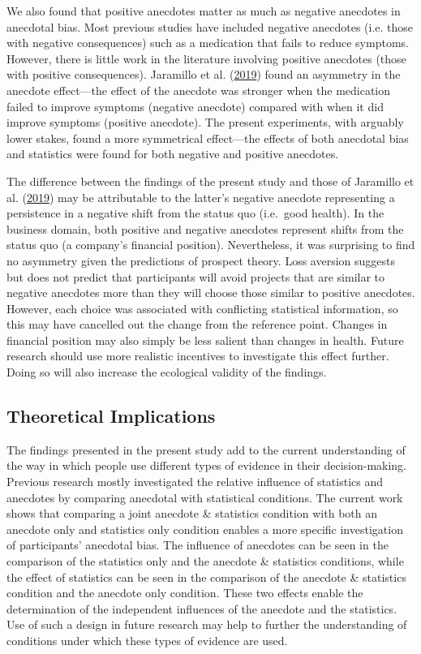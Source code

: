 \documentclass[
  man, donotrepeattitle,floatsintext]{apa7}
\theoremstyle{definition}
\theoremstyle{definition}
\theoremstyle{definition}
\theoremstyle{definition}
\theoremstyle{remark}
\begin{document}
We also found that positive anecdotes matter as much as negative anecdotes in
anecdotal bias. Most previous studies have included negative anecdotes (i.e.
those with negative consequences) such as a medication that fails to reduce
symptoms. However, there is little work in the literature involving positive
anecdotes (those with positive consequences). Jaramillo et al. (\protect\hyperlink{ref-jaramillo2019}{2019}) found an asymmetry
in the anecdote effect---the effect of the anecdote was stronger when the
medication failed to improve symptoms (negative anecdote) compared with when it
did improve symptoms (positive anecdote). The present experiments, with arguably
lower stakes, found a more symmetrical effect---the effects of both anecdotal
bias and statistics were found for both negative and positive anecdotes.

The difference between the findings of the present study and those of
Jaramillo et al. (\protect\hyperlink{ref-jaramillo2019}{2019}) may be attributable to the latter's negative anecdote
representing a persistence in a negative shift from the status quo (i.e.~good
health). In the business domain, both positive and negative anecdotes represent
shifts from the status quo (a company's financial position). Nevertheless, it
was surprising to find no asymmetry given the predictions of prospect theory.
Loss aversion suggests but does not predict that participants will avoid
projects that are similar to negative anecdotes more than they will choose those
similar to positive anecdotes. However, each choice was associated with
conflicting statistical information, so this may have cancelled out the change
from the reference point. Changes in financial position may also simply be less
salient than changes in health. Future research should use more realistic
incentives to investigate this effect further. Doing so will also increase the
ecological validity of the findings.

\hypertarget{theoretical-implications}{%
\subsection{Theoretical Implications}\label{theoretical-implications}}

The findings presented in the present study add to the current understanding of
the way in which people use different types of evidence in their
decision-making. Previous research mostly investigated the relative influence of
statistics and anecdotes by comparing anecdotal with statistical conditions. The
current work shows that comparing a joint anecdote \& statistics condition with
both an anecdote only and statistics only condition enables a more specific
investigation of participants' anecdotal bias. The influence of anecdotes can be
seen in the comparison of the statistics only and the anecdote \& statistics
conditions, while the effect of statistics can be seen in the comparison of the
anecdote \& statistics condition and the anecdote only condition. These two
effects enable the determination of the independent influences of the anecdote
and the statistics. Use of such a design in future research may help to further
the understanding of conditions under which these types of evidence are used.
\end{document}

